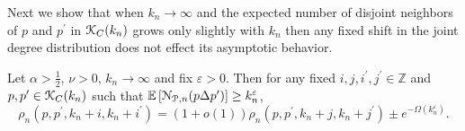 Next we show that when $k_n \to \infty$ and the expected number of disjoint neighbors of $p$ and $p^\prime$ in ${\mathcal K}_{C}(k_n)$ grows only slightly with $k_n$ then any fixed shift in the joint degree distribution does not effect its asymptotic behavior. 


\begin{lemma}\label{lem:joint_degree_distribution_shift}
Let $\alpha > \frac{1}{2}$, $\nu > 0$, $k_n \to \infty$ and fix $\varepsilon > 0$. Then for any fixed $i, j, i^\prime, j^\prime \in \mathbb{Z}$ and $p, p^\prime \in {\mathcal K}_{C}(k_n)$ such that $\mathbb{E}\left[{\mathcal N}_{{\mathcal P},n}(p \Delta p^\prime)\right] \ge k_n^\varepsilon$,
\[
	\rho_n(p,p^\prime,k_n + i,k_n + i^\prime) 
	= (1 + o(1))\rho_n(p,p^\prime, k_n + j,k_n + j^\prime)  \pm e^{-\Omega(k_n^\varepsilon)}.
\]
\end{lemma}

